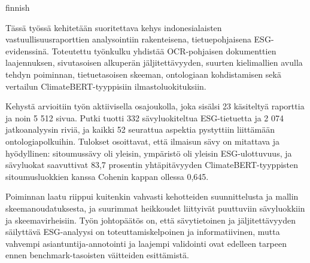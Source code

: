 \begin{thesisabstract}{finnish}
\tiivistelmametadata

Tässä työssä kehitetään suoritettava kehys indonesialaisten
vastuullisuusraporttien analysointiin rakenteisena, tietuepohjaisena
ESG-evidenssinä. Toteutettu työnkulku yhdistää OCR-pohjaisen dokumenttien
laajennuksen, sivutasoisen alkuperän jäljitettävyyden, suurten kielimallien
avulla tehdyn poiminnan, tietuetasoisen skeeman, ontologiaan kohdistamisen
sekä vertailun ClimateBERT-tyyppisiin ilmastoluokituksiin.

Kehystä arvioitiin työn aktiivisella osajoukolla, joka sisälsi 23 käsiteltyä
raporttia ja noin 5 512 sivua. Putki tuotti 332 sävyluokiteltua ESG-tietuetta
ja 2 074 jatkoanalyysin riviä, ja kaikki 52 seurattua aspektia pystyttiin
liittämään ontologiapolkuihin. Tulokset osoittavat, että ilmaisun sävy on
mitattava ja hyödyllinen: sitoumussävy oli yleisin, ympäristö oli yleisin
ESG-ulottuvuus, ja sävyluokat saavuttivat 83,7 prosentin yhtäpitävyyden
ClimateBERT-tyyppisten sitoumusluokkien kanssa Cohenin kappan ollessa 0,645.

Poiminnan laatu riippui kuitenkin vahvasti kehotteiden suunnittelusta ja mallin
skeemanoudatuksesta, ja suurimmat heikkoudet liittyivät puuttuviin sävyluokkiin
ja skeemavirheisiin. Työn johtopäätös on, että sävytietoinen ja
jäljitettävyyden säilyttävä ESG-analyysi on toteuttamiskelpoinen ja
informatiivinen, mutta vahvempi asiantuntija-annotointi ja laajempi validointi
ovat edelleen tarpeen ennen benchmark-tasoisten väitteiden esittämistä.
\end{thesisabstract}
